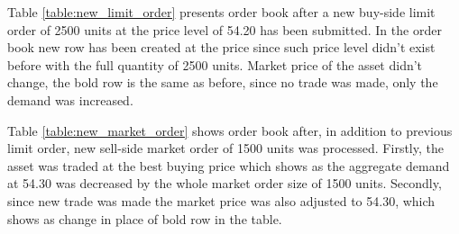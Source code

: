 \documentclass{tut-thesis}
\begin{document}
\begin{center}
\begin{minipage}{.45\textwidth}
\end{minipage}%
\begin{minipage}{.45\textwidth}
\end{minipage}
\end{center}

Table \ref{table:new_limit_order} presents order book after a new buy-side limit order of 2500 units at the price level of 54.20 has been submitted. In the order book new row has been created at the price since such price level didn't exist before with the full quantity of 2500 units. Market price of the asset didn't change, the bold row is the same as before, since no trade was made, only the demand was increased.


Table \ref{table:new_market_order} shows order book after, in addition to previous limit order, new sell-side market order of 1500 units was processed. Firstly, the asset was traded at the best buying price which shows as the aggregate demand at 54.30 was decreased by the whole market order size of 1500 units. Secondly, since new trade was made the market price was also adjusted to 54.30, which shows as change in place of bold row in the table.
\end{document}
